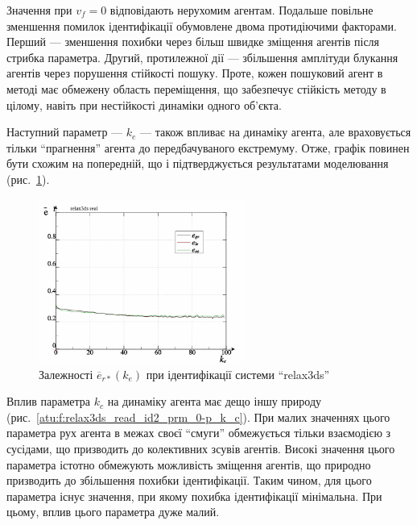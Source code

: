 Значення при
$ v_f = 0 $ відповідають нерухомим агентам. Подальше повільне
зменшення помилок ідентифікації обумовлене двома
протидіючими факторами. Перший --- зменшення похибки через
більш швидке зміщення агентів після стрибка параметра. Другий,
протилежної дії --- збільшення амплітуди блукання агентів
через порушення стійкості пошуку. Проте, кожен пошуковий агент
в методі має обмежену область переміщення, що
забезпечує стійкість методу в цілому, навіть при нестійкості
динаміки одного об'єкта.

Наступний параметр ---
$ k_e $ --- також впливає на динаміку агента, але враховується
тільки ``прагнення'' агента до передбачуваного екстремуму. Отже,
графік повинен бути схожим на попередній, що і підтверджується
результатами моделювання (рис.~\ref{atu:f:relax3ds_read_id2_prm_0-p_k_e}).

\begin{figure}[htb!]
  \centerline{\includegraphics[width=0.6\textwidth]{p/relax3ds_read_id2_prm_0-p_k_e.png} }
  \caption{Залежності $ \overline{e}_{r *} (k_e) $ при ідентифікації системи ``relax3ds''}
  \label{atu:f:relax3ds_read_id2_prm_0-p_k_e}
\end{figure}

Вплив параметра
$ k_c $ на динаміку агента має дещо іншу природу
(рис.~\ref{atu:f:relax3ds_read_id2_prm_0-p_k_c}). При малих значеннях цього параметра
рух агента в межах своєї ``смуги'' обмежується тільки взаємодією
з сусідами, що призводить до колективних зсувів агентів. Високі
значення цього параметра істотно обмежують можливість
зміщення агентів, що природно призводить до збільшення похибки
ідентифікації. Таким чином, для цього параметра існує значення,
при якому похибка ідентифікації мінімальна. При цьому,
вплив цього параметра дуже малий.

